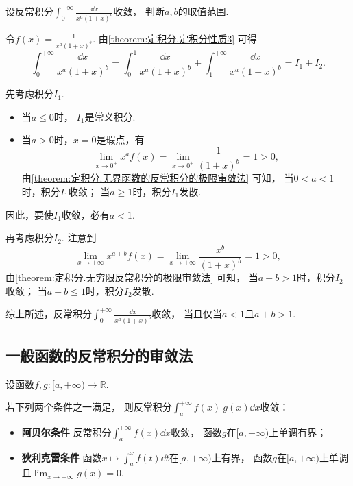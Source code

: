 \begin{example}
设反常积分\(\int_0^{+\infty} \frac{\dd{x}}{x^a (1+x)^b}\)收敛，
判断\(a,b\)的取值范围.
\begin{solution}
令\(f(x) = \frac1{x^a (1+x)^b}\).
由\cref{theorem:定积分.定积分性质3} 可得\[
	\int_0^{+\infty} \frac{\dd{x}}{x^a (1+x)^b}
	= \int_0^1 \frac{\dd{x}}{x^a (1+x)^b}
	+ \int_1^{+\infty} \frac{\dd{x}}{x^a (1+x)^b}
	= I_1 + I_2.
\]

先考虑积分\(I_1\).
\begin{itemize}
	\item 当\(a\leq0\)时，
	\(I_1\)是常义积分.
	\item 当\(a>0\)时，\(x=0\)是瑕点，有\[
		\lim_{x\to0^+} x^a f(x)
		= \lim_{x\to0^+} \frac1{(1+x)^b}
		= 1 > 0,
	\]
	由\cref{theorem:定积分.无界函数的反常积分的极限审敛法} 可知，
	当\(0<a<1\)时，积分\(I_1\)收敛；
	当\(a\geq1\)时，积分\(I_1\)发散.
\end{itemize}
因此，要使\(I_1\)收敛，必有\(a < 1\).

再考虑积分\(I_2\).
注意到\[
	\lim_{x\to+\infty} x^{a+b} f(x)
	= \lim_{x\to+\infty} \frac{x^b}{(1+x)^b}
	= 1 > 0,
\]
由\cref{theorem:定积分.无穷限反常积分的极限审敛法} 可知，
当\(a+b>1\)时，积分\(I_2\)收敛；
当\(a+b\leq1\)时，积分\(I_2\)发散.

综上所述，反常积分\(\int_0^{+\infty} \frac{\dd{x}}{x^a (1+x)^b}\)收敛，
当且仅当\(a<1\)且\(a+b>1\).
\end{solution}
\end{example}

\subsection{一般函数的反常积分的审敛法}
\begin{theorem}\label{theorem:反常积分.无穷限的反常积分的阿贝尔--狄利克雷审敛法}
设函数\(f,g\colon[a,+\infty)\to\mathbb{R}\).

若下列两个条件之一满足，
则反常积分\(\int_a^{+\infty} f(x) ~ g(x) \dd{x}\)收敛：\begin{itemize}
	\item {\rm\bf 阿贝尔条件}
	反常积分\(\int_a^{+\infty} f(x) \dd{x}\)收敛，
	函数\(g\)在\([a,+\infty)\)上单调有界；

	\item {\rm\bf 狄利克雷条件}
	函数\(x \mapsto \int_a^x f(t) \dd{t}\)在\([a,+\infty)\)上有界，
	函数\(g\)在\([a,+\infty)\)上单调且\(\lim_{x\to+\infty} g(x) = 0\).
\end{itemize}
\end{theorem}

